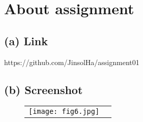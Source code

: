 \documentclass[ebook,12pt,oneside,openany]{memoir}
\begin{document}
\section{About assignment}

\subsection{(a) Link}
https://github.com/JinsolHa/assignment01

\subsection{(b) Screenshot}
\begin{figure}
\begin{center}
\begin{tabular}{cc}
\texttt{[image: fig6.jpg]}\\
\end{tabular}
\end{center}
\end{figure}
\end{document}

